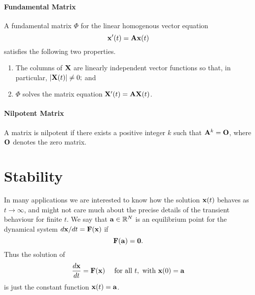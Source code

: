 \paragraph{Fundamental Matrix}
A fundamental matrix \(\Phi\) for the linear homogenous vector equation
\[\mathbf{x}'(t) = \mathbf{A}\mathbf{x}(t)\]
satisfies the following two properties.
\begin{enumerate}
    \item The columns of \(\mathbf{X}\) are linearly independent vector functions so that, in particular, \(|\mathbf{X}(t)| \neq 0;\) and
    \item \(\Phi\) solves the matrix equation \(\mathbf{X}'(t) = \mathbf{A}\mathbf{X}(t)\).
\end{enumerate}


\paragraph{Nilpotent Matrix}
A matrix is nilpotent if there exists a positive integer \(k\) such that \(\mathbf{A}^k = \mathbf{O}\), where \(\mathbf{O}\) denotes the zero matrix.


\section{Stability}
In many applications we are interested to know how the solution \(\mathbf{x}(t)\) behaves as \(t \to \infty\), and might not care much about the precise details of the transient behaviour for finite \(t\).
We say that \(\mathbf{a} \in \mathbb{R}^N\) is an equilibrium point for the dynamical system \(d \mathbf{x} / dt = \mathbf{F}(\mathbf{x})\) if
\[\mathbf{F}(\mathbf{a}) = \mathbf{0}.\]
Thus the solution of
\[\frac{d\mathbf{x}}{dt} = \mathbf{F}(\mathbf{x}) \quad  \text{ for all } t, \text{ with } \mathbf{x}(0) = \mathbf{a}\]
is just the constant function \(\mathbf{x}(t) = \mathbf{a}\).

